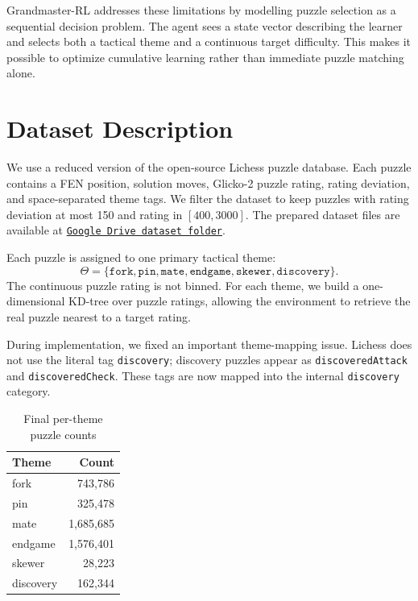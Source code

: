 \documentclass[10pt,twocolumn]{article}
\begin{document}
Grandmaster-RL addresses these limitations by modelling puzzle selection as a
sequential decision problem. The agent sees a state vector describing the learner and
selects both a tactical theme and a continuous target difficulty. This makes it
possible to optimize cumulative learning rather than immediate puzzle matching alone.

\section{Dataset Description}

We use a reduced version of the open-source Lichess puzzle database. Each puzzle
contains a FEN position, solution moves, Glicko-2 puzzle rating, rating deviation, and
space-separated theme tags. We filter the dataset to keep puzzles with rating
deviation at most 150 and rating in $[400,3000]$. The prepared dataset files are
available at
\href{https://drive.google.com/drive/folders/1AXQDvtR4Y1rbuMHVfYMX1FZpv5W6oESB}
{\texttt{Google Drive dataset folder}}.

Each puzzle is assigned to one primary tactical theme:
\[
\Theta = \{\texttt{fork}, \texttt{pin}, \texttt{mate}, \texttt{endgame},
\texttt{skewer}, \texttt{discovery}\}.
\]
The continuous puzzle rating is not binned. For each theme, we build a one-dimensional
KD-tree over puzzle ratings, allowing the environment to retrieve the real puzzle
nearest to a target rating.

During implementation, we fixed an important theme-mapping issue. Lichess does not use
the literal tag \texttt{discovery}; discovery puzzles appear as \texttt{discoveredAttack}
and \texttt{discoveredCheck}. These tags are now mapped into the internal
\texttt{discovery} category.

\begin{table}[h]
\centering
\caption{Final per-theme puzzle counts}
\begin{tabular}{lr}
\toprule
\textbf{Theme} & \textbf{Count} \\
\midrule
fork & 743,786 \\
pin & 325,478 \\
mate & 1,685,685 \\
endgame & 1,576,401 \\
skewer & 28,223 \\
discovery & 162,344 \\
\bottomrule
\end{tabular}
\end{table}
\end{document}
